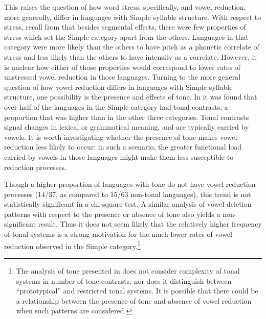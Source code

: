   This raises the question of how word stress, specifically, and vowel reduction, more generally, differ in languages with Simple syllable structure. With respect to stress, recall from  that besides segmental effects, there were few properties of stress which set the Simple category apart from the others. Languages in that category were more likely than the others to have pitch as a phonetic correlate of stress and less likely than the others to have intensity as a correlate. However, it is unclear how either of those properties would correspond to lower rates of unstressed vowel reduction in those languages. Turning to the more general question of how vowel reduction differs in languages with Simple syllable structure, one possibility is the presence and effects of tone. In  it was found that over half of the languages in the Simple category had tonal contrasts, a proportion that was higher than in the other three categories. Tonal contrasts signal changes in lexical or grammatical meaning, and are typically carried by vowels. It is worth investigating whether the presence of tone makes vowel reduction less likely to occur: in such a scenario, the greater functional load carried by vowels in those languages might make them less susceptible to reduction processes.

  Though a higher proportion of languages with tone do not have vowel reduction processes (14/37, as compared to 15/63 non-tonal languages), this trend is not statistically significant in a chi-square test. A similar analysis of vowel deletion patterns with respect to the presence or absence of tone also yields a non-significant result. Thus it does not seem likely that the relatively higher frequency of tonal systems is a strong motivation for the much lower rates of vowel reduction observed in the Simple category.\footnote{{The analysis of tone presented in  does not consider complexity of tonal systems in number of tone contrasts,  nor does it distinguish between ``prototypical'' and restricted tonal systems. It is possible that there could be a relationship between the presence of tone and absence of vowel reduction when such patterns are considered.}}

